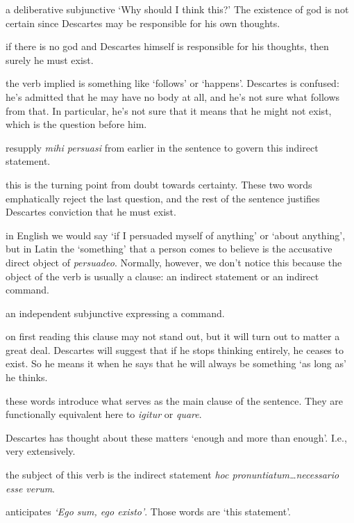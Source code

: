  a deliberative subjunctive `Why should I think this?' The existence of god is not certain since Descartes may be responsible for his own thoughts.

 if there is no god and Descartes himself is responsible for his thoughts, then surely he must exist.

 the verb implied is something like `follows' or `happens'. Descartes is confused: he's admitted that he may have no body at all, and he's not sure what follows from that. In particular, he's not sure that it means that he might not exist, which is the question before him.

 resupply \textit{mihi persuasi} from earlier in the sentence to govern this indirect statement.

 this is the turning point from doubt towards certainty. These two words emphatically reject the last question, and the rest of the sentence justifies Descartes conviction that he must exist.

 in English we would say `if I persuaded myself of anything' or `about anything', but in Latin the `something' that a person comes to believe is the accusative direct object of \textit{persuadeo}. Normally, however, we don't notice this because the object of the verb is usually a clause: an indirect statement or an indirect command.

 an independent subjunctive expressing a command.

 on first reading this clause may not stand out, but it will turn out to matter a great deal. Descartes will suggest that if he stops thinking entirely, he ceases to exist. So he means it when he says that he will always be something `as long as' he thinks.

 these words introduce what serves as the main clause of the sentence. They are functionally equivalent here to \textit{igitur} or \textit{quare}.

 Descartes has thought about these matters `enough and more than enough'. I.e., very extensively.

 the subject of this verb is the indirect statement \textit{hoc pronuntiatum\dots necessario esse verum}.

 anticipates \textit{`Ego sum, ego existo'}. Those words are `this statement'.


